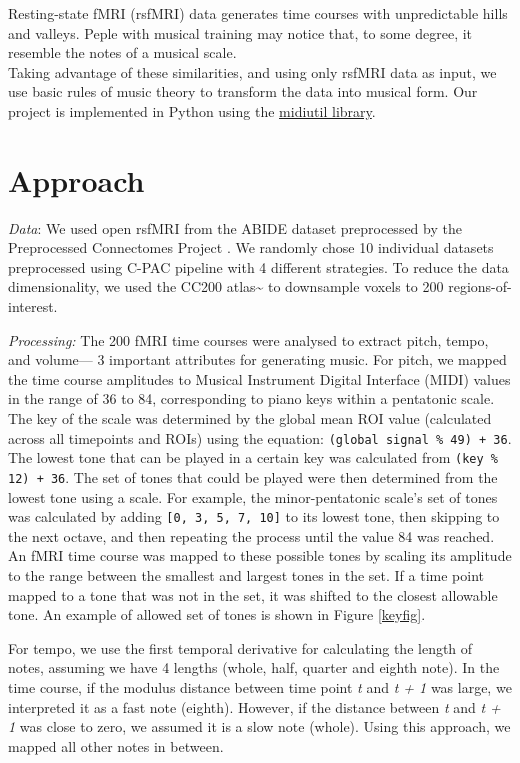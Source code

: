 \documentclass[twocolumn]{bmcart}%
\begin{document}
Resting-state fMRI (rsfMRI) data generates time courses with
unpredictable hills and valleys. Peple with musical training may notice
that, to some degree, it resemble the notes of a musical scale.\\Taking
advantage of these similarities, and using only rsfMRI data as input, we
use basic rules of music theory to transform the data into musical form.
Our project is implemented in Python using the
\href{https://code.google.com/p/midiutil/}{midiutil library}.

\section{Approach}\label{approach}

\textit{Data}: We used open rsfMRI from the ABIDE dataset
\cite{di2014autism} preprocessed by the Preprocessed Connectomes Project
\cite{pcp}. We randomly chose 10 individual datasets preprocessed using
C-PAC pipeline \cite{Craddock2013c} with 4 different strategies. To
reduce the data dimensionality, we used the CC200
atlas\textasciitilde{}\cite{cc200} to downsample voxels to 200
regions-of-interest.

\textit{Processing:} The 200 fMRI time courses were analysed to extract
pitch, tempo, and volume--- 3 important attributes for generating music.
For pitch, we mapped the time course amplitudes to Musical Instrument
Digital Interface (MIDI) values in the range of 36 to 84, corresponding
to piano keys within a pentatonic scale. The key of the scale was
determined by the global mean ROI value (calculated across all
timepoints and ROIs) using the equation:
\texttt{(global signal \% 49) + 36}. The lowest tone that can be played
in a certain key was calculated from \texttt{(key \% 12) + 36}. The set
of tones that could be played were then determined from the lowest tone
using a scale. For example, the minor-pentatonic scale's set of tones
was calculated by adding \texttt{[0, 3, 5, 7, 10]} to its lowest tone,
then skipping to the next octave, and then repeating the process until
the value 84 was reached. An fMRI time course was mapped to these
possible tones by scaling its amplitude to the range between the
smallest and largest tones in the set. If a time point mapped to a tone
that was not in the set, it was shifted to the closest allowable tone.
An example of allowed set of tones is shown in Figure \ref{keyfig}.

For tempo, we use the first temporal derivative for calculating the
length of notes, assuming we have 4 lengths (whole, half, quarter and
eighth note). In the time course, if the modulus distance between time
point \textit{t} and \textit{t + 1} was large, we interpreted it as a
fast note (eighth). However, if the distance between \textit{t} and
\textit{t + 1} was close to zero, we assumed it is a slow note (whole).
Using this approach, we mapped all other notes in between.
\end{document}
